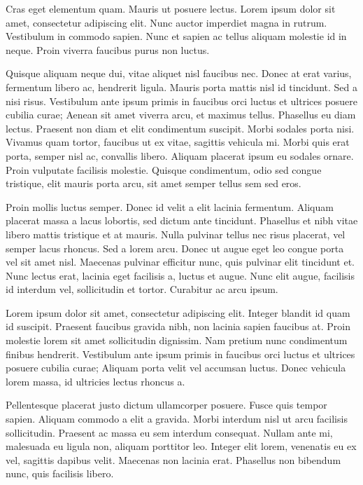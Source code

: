 \documentclass{homework}
\begin{document}
Cras eget elementum quam. Mauris ut posuere lectus. Lorem ipsum dolor sit amet, consectetur adipiscing elit. Nunc auctor imperdiet magna in rutrum. Vestibulum in commodo sapien. Nunc et sapien ac tellus aliquam molestie id in neque. Proin viverra faucibus purus non luctus.

Quisque aliquam neque dui, vitae aliquet nisl faucibus nec. Donec at erat varius, fermentum libero ac, hendrerit ligula. Mauris porta mattis nisl id tincidunt. Sed a nisi risus. Vestibulum ante ipsum primis in faucibus orci luctus et ultrices posuere cubilia curae; Aenean sit amet viverra arcu, et maximus tellus. Phasellus eu diam lectus. Praesent non diam et elit condimentum suscipit. Morbi sodales porta nisi. Vivamus quam tortor, faucibus ut ex vitae, sagittis vehicula mi. Morbi quis erat porta, semper nisl ac, convallis libero. Aliquam placerat ipsum eu sodales ornare. Proin vulputate facilisis molestie. Quisque condimentum, odio sed congue tristique, elit mauris porta arcu, sit amet semper tellus sem sed eros.

Proin mollis luctus semper. Donec id velit a elit lacinia fermentum. Aliquam placerat massa a lacus lobortis, sed dictum ante tincidunt. Phasellus et nibh vitae libero mattis tristique et at mauris. Nulla pulvinar tellus nec risus placerat, vel semper lacus rhoncus. Sed a lorem arcu. Donec ut augue eget leo congue porta vel sit amet nisl. Maecenas pulvinar efficitur nunc, quis pulvinar elit tincidunt et. Nunc lectus erat, lacinia eget facilisis a, luctus et augue. Nunc elit augue, facilisis id interdum vel, sollicitudin et tortor. Curabitur ac arcu ipsum.

Lorem ipsum dolor sit amet, consectetur adipiscing elit. Integer blandit id quam id suscipit. Praesent faucibus gravida nibh, non lacinia sapien faucibus at. Proin molestie lorem sit amet sollicitudin dignissim. Nam pretium nunc condimentum finibus hendrerit. Vestibulum ante ipsum primis in faucibus orci luctus et ultrices posuere cubilia curae; Aliquam porta velit vel accumsan luctus. Donec vehicula lorem massa, id ultricies lectus rhoncus a.

Pellentesque placerat justo dictum ullamcorper posuere. Fusce quis tempor sapien. Aliquam commodo a elit a gravida. Morbi interdum nisl ut arcu facilisis sollicitudin. Praesent ac massa eu sem interdum consequat. Nullam ante mi, malesuada eu ligula non, aliquam porttitor leo. Integer elit lorem, venenatis eu ex vel, sagittis dapibus velit. Maecenas non lacinia erat. Phasellus non bibendum nunc, quis facilisis libero.
\end{document}
